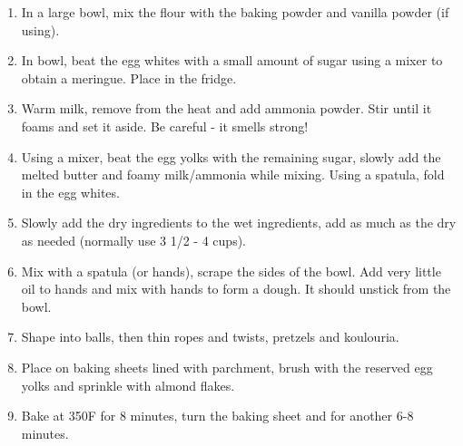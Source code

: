 \begin{enumerate}
    \item In a large bowl, mix the flour with the baking powder and vanilla powder (if using).
    \item In bowl, beat the egg whites with a small amount of sugar using a mixer to obtain a meringue. Place in the fridge.
    \item Warm milk, remove from the heat and add ammonia powder. Stir until it foams and set it aside. Be careful - it smells strong!
    \item Using a mixer, beat the egg yolks with the remaining sugar, slowly add the melted butter and foamy milk/ammonia while mixing. Using a spatula, fold in the egg whites.
    \item Slowly add the dry ingredients to the wet ingredients, add as much as the dry as needed (normally use 3 1/2 - 4 cups).
    \item Mix with a spatula (or hands), scrape the sides of the bowl. Add very little oil to hands and mix with hands to form a dough. It should unstick from the bowl.
    \item Shape into balls, then thin ropes and twists, pretzels and koulouria.
    \item Place on baking sheets lined with parchment, brush with the reserved egg yolks and sprinkle with almond flakes.
    \item Bake at 350\degree F for 8 minutes, turn the baking sheet and for another 6-8 minutes.
\end{enumerate}

